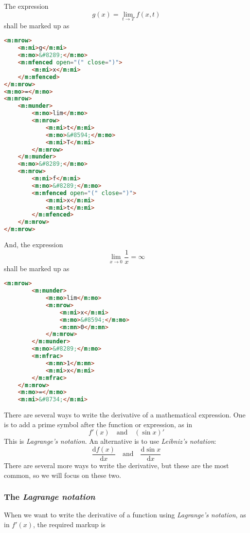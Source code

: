 \documentclass[english,a4paper,11pt]{article}
\begin{document}
\begin{eksempler}
	
	The expression 
\begin{equation}
g(x) =\lim_{t \rightarrow T} f(x,t)
\end{equation}
shall be marked up as
\begin{lstlisting}[language=HTML]
<m:mrow>
	<m:mi>g</m:mi>
	<m:mo>&#8289;</m:mo>
	<m:mfenced open="(" close=")">
		<m:mi>x</m:mi>
	</m:mfenced>
</m:mrow>
<m:mo>=</m:mo>
<m:mrow>
	<m:munder>
		<m:mo>lim</m:mo>
		<m:mrow>
			<m:mi>t</m:mi>
			<m:mo>&#8594;</m:mo>
			<m:mi>T</m:mi>
		</m:mrow>
	</m:munder>
	<m:mo>&#8289;</m:mo>
	<m:mrow>
		<m:mi>f</m:mi>
		<m:mo>&#8289;</m:mo>
		<m:mfenced open="(" close=")">
			<m:mi>x</m:mi>
			<m:mi>t</m:mi>
		</m:mfenced>
	</m:mrow>
</m:mrow>
\end{lstlisting}

	And, the expression 
	\begin{equation}
	\lim_{x \rightarrow 0} \frac{1}{x} = \infty
	\end{equation}
	shall be marked up as
	\begin{lstlisting}[language=HTML]
	<m:mrow>
		<m:munder>
			<m:mo>lim</m:mo>
			<m:mrow>
				<m:mi>x</m:mi>
				<m:mo>&#8594;</m:mo>
				<m:mn>0</m:mn>
			</m:mrow>
		</m:munder>
		<m:mo>&#8289;</m:mo>
		<m:mfrac>
			<m:mn>1</m:mn>
			<m:mi>x</m:mi>
		</m:mfrac>
	</m:mrow>
	<m:mo>=</m:mo>
	<m:mi>&#8734;</m:mi>
	\end{lstlisting}
\end{eksempler}

\bigskip
There are several ways to write the derivative of a mathematical expression. One is to add a prime symbol after the function or expression, as in 
\begin{equation}
f'(x)\quad\text{and}\quad (\sin x)'
\end{equation}
This is \emph{Lagrange's notation}. An alternative is to use \emph{Leibniz's notation}:
\begin{equation}
\frac{\text{d}f(x)}{\text{d}x}\quad\text{and}\quad \frac{\text{d}\sin x}{\text{d}x}
\end{equation}
There are several more ways to write the derivative, but these are the most common, so we will focus on these two.

\subsubsection{The \emph{Lagrange notation}}
When we want to write the derivative of a function using \emph{Lagrange's notation}, as in $f'(x)$, the required markup is
\end{document}
